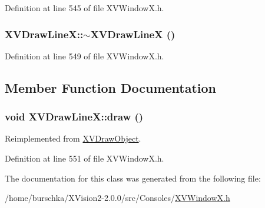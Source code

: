 Definition at line 545 of file XVWindow\-X.h.\label{XVDrawLineX_a1}
\hypertarget{class_XVDrawLineX_a1}{
\subsubsection[~XVDrawLineX]{\setlength{\rightskip}{0pt plus 5cm}XVDraw\-Line\-X::$\sim$XVDraw\-Line\-X ()}}




Definition at line 549 of file XVWindow\-X.h.

\subsection{Member Function Documentation}
\label{XVDrawLineX_a2}
\hypertarget{class_XVDrawLineX_a2}{
\subsubsection[draw]{\setlength{\rightskip}{0pt plus 5cm}void XVDraw\-Line\-X::draw ()}}




Reimplemented from \hyperlink{class_XVDrawObject}{XVDraw\-Object}.

Definition at line 551 of file XVWindow\-X.h.

The documentation for this class was generated from the following file:\begin{CompactItemize}
\item 
/home/burschka/XVision2-2.0.0/src/Consoles/\hyperlink{XVWindowX.h-source}{XVWindow\-X.h}\end{CompactItemize}
